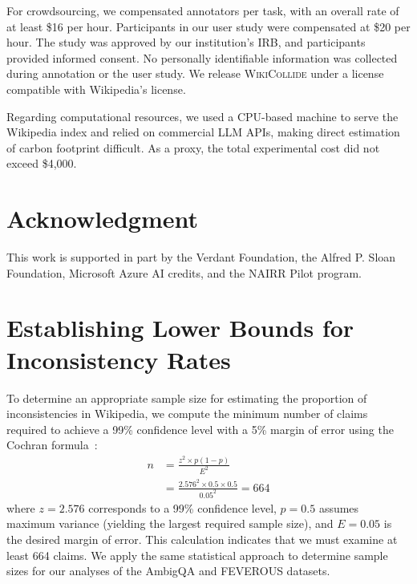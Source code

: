 \documentclass[11pt]{article}
\newcommand{\dataset}[0]{\textsc{WikiCollide}\xspace}
\begin{document}
For crowdsourcing, we compensated annotators per task, with an overall rate of at least \$16 per hour. Participants in our user study were compensated at \$20 per hour. The study was approved by our institution's IRB, and participants provided informed consent. No personally identifiable information was collected during annotation or the user study. We release \dataset under a license compatible with Wikipedia's license.

Regarding computational resources, we used a CPU-based machine to serve the Wikipedia index and relied on commercial LLM APIs, making direct estimation of carbon footprint difficult. As a proxy, the total experimental cost did not exceed \$4,000.

\section*{Acknowledgment}
This work is supported in part by the Verdant Foundation, the Alfred P. Sloan Foundation, Microsoft Azure AI credits, and the NAIRR Pilot program.





\appendix


\appendix

\section{Establishing Lower Bounds for Inconsistency Rates}
\label{sec:inconsistency-calculation}

To determine an appropriate sample size for estimating the proportion of inconsistencies in Wikipedia, we compute the minimum number of claims required to achieve a 99\% confidence level with a 5\% margin of error using the Cochran formula~\citep{cochran1953sampling}:
\begin{align*}
n &= \frac{z^2 \times p(1-p)}{E^2}  \\ &= \frac{2.576^2 \times 0.5 \times 0.5}{0.05^2} = 664
\end{align*}
where $z = 2.576$ corresponds to a 99\% confidence level, $p = 0.5$ assumes maximum variance (yielding the largest required sample size), and $E = 0.05$ is the desired margin of error. This calculation indicates that we must examine at least 664 claims. We apply the same statistical approach to determine sample sizes for our analyses of the AmbigQA and FEVEROUS datasets.
\end{document}
